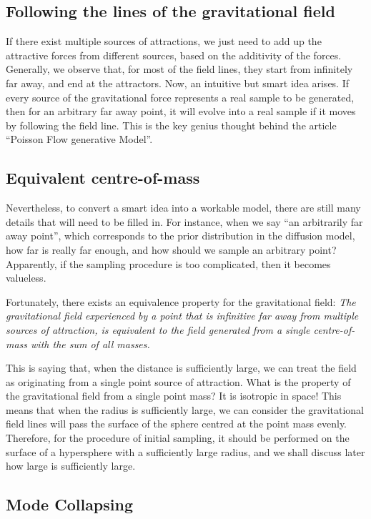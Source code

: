 \subsection{Following the lines of the gravitational field}

If there exist multiple sources of attractions, we just need to add up the attractive forces from different sources, based on the additivity of the forces. Generally, we observe that, for most of the field lines, they start from infinitely far away, and end at the attractors. Now, an intuitive but smart idea arises. If every source of the gravitational force represents a real sample to be generated, then for an arbitrary far away point, it will evolve into a real sample if it moves by following the field line. This is the key genius thought behind the article ``Poisson Flow generative Model''.

\subsection{Equivalent centre-of-mass}

Nevertheless, to convert a smart idea into a workable model, there are still many details that will need to be filled in. For instance, when we say ``an arbitrarily far away point'', which corresponds to the prior distribution in the diffusion model, how far is really far enough, and how should we sample an arbitrary point? Apparently, if the sampling procedure is too complicated, then it becomes valueless. 

Fortunately, there exists an equivalence property for the gravitational field: \emph{The gravitational field experienced by a point that is infinitive far away from multiple sources of attraction, is equivalent to the field generated from a single centre-of-mass with the sum of all masses.}

This is saying that, when the distance is sufficiently large, we can treat the field as originating from a single point source of attraction. What is the property of the gravitational field from a single point mass? It is isotropic in space! This means that when the radius is sufficiently large, we can consider the gravitational field lines will pass the surface of the sphere centred at the point mass evenly. Therefore, for the procedure of initial sampling, it should be performed on the surface of a hypersphere with a sufficiently large radius, and we shall discuss later how large is sufficiently large.

\subsection{Mode Collapsing}

